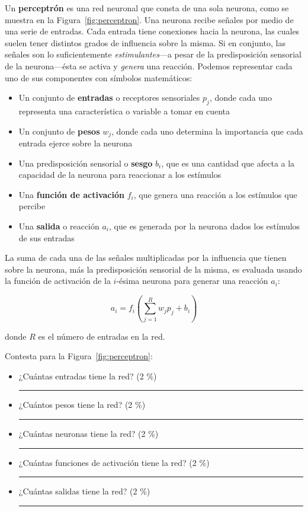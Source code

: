 \documentclass{article}
\newcommand{\veryshortresponserule}{{\large\rule{3 cm}{0.3mm}}}
\begin{document}
Un \textbf{perceptrón} es una red neuronal que consta de una sola neurona, como se muestra en la Figura~\ref{fig:perceptron}.
Una neurona recibe señales por medio de una serie de entradas.
Cada entrada tiene conexiones hacia la neurona, las cuales suelen tener distintos grados de influencia sobre la misma.
Si en conjunto, las señales son lo suficientemente \textit{estimulantes}---a pesar de la predisposición sensorial de la neurona---ésta se activa y \textit{genera} una reacción.
Podemos representar cada uno de sus componentes con símbolos matemáticos:
\begin{itemize}
    \item Un conjunto de \textbf{entradas} o receptores sensoriales $p_j$, donde cada uno representa una característica o variable a tomar en cuenta
    \item Un conjunto de \textbf{pesos} $w_{j}$, donde cada uno determina la importancia que cada entrada ejerce sobre la neurona
    \item Una predisposición sensorial o \textbf{sesgo} $b_i$, que es una cantidad que afecta a la capacidad de la neurona para reaccionar a los estímulos
    \item Una \textbf{función de activación} $f_i$, que genera una reacción a los estímulos que percibe
    \item Una \textbf{salida} o reacción $a_i$, que es generada por la neurona dados los estímulos de sus entradas
\end{itemize}

La suma de cada una de las señales multiplicadas por la influencia que tienen sobre la neurona, más la predisposición sensorial de la misma, es evaluada usando la función de activación de la $i$-ésima neurona para generar una reacción $a_i$:

\begin{equation}
    a_i = f_i\left( \sum_{j=1}^{R} w_jp_j + b_i \right)
\end{equation}

donde $R$ es el número de entradas en la red.

\vspace{2.5ex}

Contesta para la Figura~\ref{fig:perceptron}:

\begin{itemize}
    \item ¿Cuántas entradas tiene la red? (2 \%)\hfill \veryshortresponserule
    \item ¿Cuántos pesos tiene la red? (2 \%)\hfill \veryshortresponserule
    \item ¿Cuántas neuronas tiene la red? (2 \%)\hfill \veryshortresponserule
    \item ¿Cuántas funciones de activación tiene la red? (2 \%)\hfill \veryshortresponserule
    \item ¿Cuántas salidas tiene la red? (2 \%)\hfill \veryshortresponserule
\end{itemize}
\end{document}
